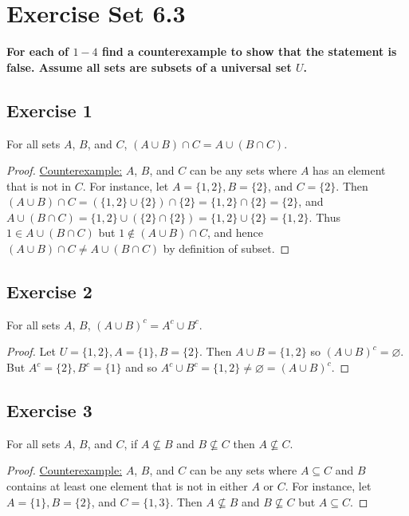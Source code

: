 \documentclass[14pt]{extarticle}
\newcommand{\es}{\varnothing}
\newcommand{\cy}{\color{cyan}}
\begin{document}
\section{Exercise Set 6.3}

{\bf \cy For each of $1-4$ find a counterexample to show that the statement is false. Assume all sets are subsets of a universal set $U$.}

\subsection{Exercise 1}
For all sets $A$, $B$, and $C$, \((A \cup B) \cap C = A \cup (B \cap C)\).

\begin{proof}
\underline{Counterexample:} $A$, $B$, and $C$ can be any sets where $A$ has an element that is not in $C$. For 
instance, let \(A = \{1, 2\}, B = \{2\}\), and \(C = \{2\}\). Then \((A \cup B) \cap C = (\{1, 2\} \cup \{2\}) \cap 
\{2\} = \{1, 2\} \cap \{2\} = \{2\}\), and \(A \cup (B \cap C) = \{1, 2\} \cup (\{2\} \cap \{2\}) = \{1, 2\} \cup \{2\} 
= \{1, 2\}\). Thus \(1 \in A \cup (B \cap C)\) but \(1 \notin (A \cup B) \cap C\), and hence \((A \cup B) \cap C 
\neq A \cup (B \cap C)\) by definition of subset.
\end{proof}

\subsection{Exercise 2}
For all sets $A$, $B$, \((A \cup B)^c = A^c \cup B^c\).

\begin{proof}
Let \(U = \{1, 2\}, A = \{1\}, B = \{2\}\). Then \(A \cup B = \{1, 2\}\) so \((A \cup B)^c = \es\). But \(A^c = \{2\}, 
B^c = \{1\}\) and so \(A^c \cup B^c = \{1, 2\} \neq \es = (A \cup B)^c\).
\end{proof}

\subsection{Exercise 3}
For all sets $A$, $B$, and $C$, if \(A \nsubseteq B\) and \(B \nsubseteq C\) then \(A \nsubseteq C\).

\begin{proof}
\underline{Counterexample:} $A$, $B$, and $C$ can be any sets where \(A \subseteq C\) and $B$ contains at least one 
element that is not in either $A$ or $C$. For instance, let \(A = \{1\}, B = \{2\}\), and \(C = \{1, 3\}\). Then 
\(A \nsubseteq B\) and \(B \nsubseteq C\) but \(A \subseteq C\).
\end{proof}
\end{document}
